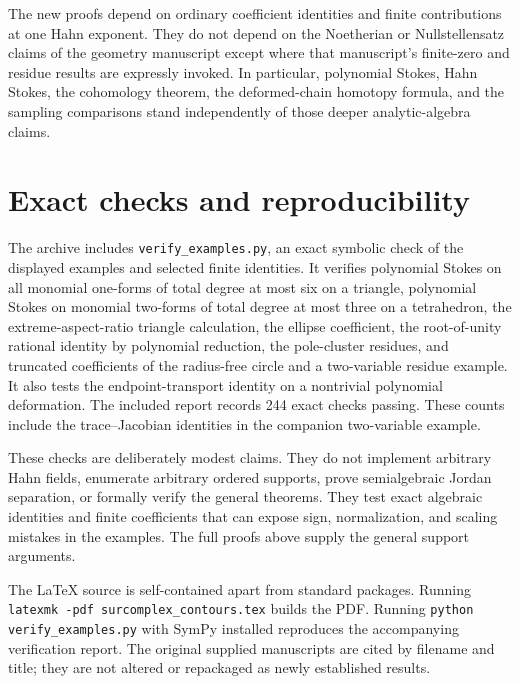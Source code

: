 \documentclass[11pt,letterpaper]{article}
\theoremstyle{definition}
\theoremstyle{remark}
\numberwithin{equation}{section}
\begin{document}
The new proofs depend on ordinary coefficient identities and finite contributions at one Hahn exponent. They do not depend on the Noetherian or Nullstellensatz claims of the geometry manuscript except where that manuscript's finite-zero and residue results are expressly invoked. In particular, polynomial Stokes, Hahn Stokes, the cohomology theorem, the deformed-chain homotopy formula, and the sampling comparisons stand independently of those deeper analytic-algebra claims.

\section{Exact checks and reproducibility}\label{app:checks}
The archive includes \texttt{verify\_examples.py}, an exact symbolic check of the displayed examples and selected finite identities. It verifies polynomial Stokes on all monomial one-forms of total degree at most six on a triangle, polynomial Stokes on monomial two-forms of total degree at most three on a tetrahedron, the extreme-aspect-ratio triangle calculation, the ellipse coefficient, the root-of-unity rational identity by polynomial reduction, the pole-cluster residues, and truncated coefficients of the radius-free circle and a two-variable residue example. It also tests the endpoint-transport identity on a nontrivial polynomial deformation. The included report records 244 exact checks passing. These counts include the trace--Jacobian identities in the companion two-variable example.

These checks are deliberately modest claims. They do not implement arbitrary Hahn fields, enumerate arbitrary ordered supports, prove semialgebraic Jordan separation, or formally verify the general theorems. They test exact algebraic identities and finite coefficients that can expose sign, normalization, and scaling mistakes in the examples. The full proofs above supply the general support arguments.

The LaTeX source is self-contained apart from standard packages. Running \texttt{latexmk -pdf surcomplex\_contours.tex} builds the PDF. Running \texttt{python verify\_examples.py} with SymPy installed reproduces the accompanying verification report. The original supplied manuscripts are cited by filename and title; they are not altered or repackaged as newly established results.
\end{document}
